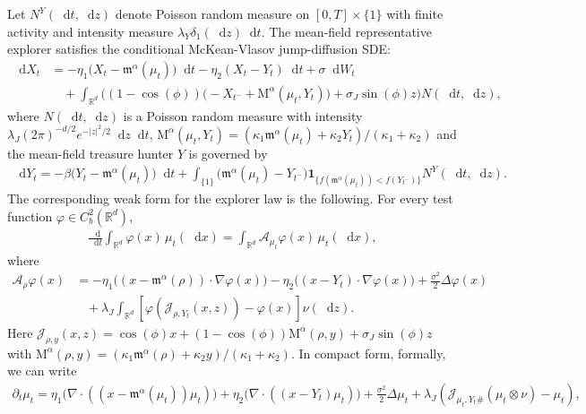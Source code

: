 \documentclass{article}
\def\m{\mathfrak{m}}
\newcommand*\der{\mathop{}\!\mathrm{d}}
\numberwithin{equation}{section}
\begin{document}
 Let $N^{Y}(\der t, \der z)$ denote Poisson random measure on $[0,T]\times \{1\}$ with finite activity and intensity measure $\lambda_Y \delta_1 (\der z)\der t$. 
The mean-field representative explorer satisfies the conditional McKean-Vlasov jump-diffusion SDE:
\begin{align}
\der X_t
&= -\eta_1\bigl(X_t -\mathfrak{m}^\alpha(\mu_t)\bigr)\der t - \eta_2 (X_t- Y_t) \der t + 
\sigma\der W_t \nonumber \\
&\quad + \int_{\mathbb R^d}
\Big((1-\cos(\phi))
\big(
-X_{t^-}+ \mathrm{M}^\alpha(\mu_t,Y_t)
\big) + \sigma_J\sin(\phi)z\Big)
N(\der t,\der z), \label{tso_eqn_mf}
\end{align}
where $N(\der t,\der z)$ is a Poisson random measure with intensity $\lambda_J(2\pi)^{-d/2}e^{-|z|^2/2}\der z \der t$, $\mathrm{M}^\alpha(\mu_t, Y_t) = (\kappa_1 \m^\alpha(\mu_t) + \kappa_2 Y_t)/(\kappa_1 + \kappa_2) $ and the mean-field treasure hunter $Y$ is governed by
\begin{align}\label{tso_eqn_y_meanf}
    \der Y_t = -\beta\big(Y_t -\mathfrak{m}^\alpha(\mu_t)\big) \der t  + \int_{\{1\}}\bigl(\mathfrak{m}^\alpha(\mu_t)-Y_{t^-}\bigr)
    \mathbf 1_{\{f(\mathfrak{m}^\alpha(\mu_t))<f(Y_{t^-})\}} N^{Y}(\der t, \der z). 
\end{align}
The corresponding weak form for the explorer law is the following. For every
test function $\varphi\in C_b^2(\mathbb R^d)$,
\begin{align*}
\frac{\der }{\der t}
\int_{\mathbb R^d}\varphi(x)\,\mu_t(\der x)
= \int_{\mathbb{R}^d}
\mathcal A_{\mu_t}\varphi(x)\,\mu_t(\der x),
\end{align*}
where
\begin{align*}
\mathcal A_{\rho}\varphi(x)
& =
-\eta_1\bigl( (x-\mathfrak{m}^\alpha(\rho))\cdot\nabla\varphi(x)\bigr) -\eta_2\bigl( (x-Y_t)\cdot\nabla\varphi(x)\bigr)
+
\frac{\sigma^2}{2}\Delta\varphi(x)
\nonumber \\   &   \;\;\;+
\lambda_J
\int_{\mathbb R^d}
\left[\varphi(
\mathcal{J}_{\rho, Y_t}(x,z) ) - \varphi(x)
\right] \nu(\der z).
\end{align*}
Here  $\mathcal{J}_{\rho,y}(x,z) = \cos(\phi)x + ( 1- \cos(\phi) )\mathrm{M}^\alpha(\rho, y)+\sigma_J\sin(\phi)z $ with $\mathrm{M}^{\alpha}(\rho, y) = (\kappa_1 \mathfrak{m}^{\alpha}(\rho) + \kappa_2 y)/(\kappa_1 + \kappa_2) $.
In compact form, formally, we can write
\begin{align*}
\partial_t\mu_t =
\eta_1\big(\nabla\cdot (
(x-\mathfrak{m}^\alpha(\mu_t))\mu_t
)\big) + \eta_2\big(\nabla \cdot ((x- Y_t)\mu_t)\big) + 
\frac{\sigma^2}{2}\Delta\mu_t
+ \lambda_J
\left(\mathcal J_{\mu_t,Y_t\#}(\mu_t\otimes\nu)
- \mu_t \right),
\end{align*}
\end{document}
